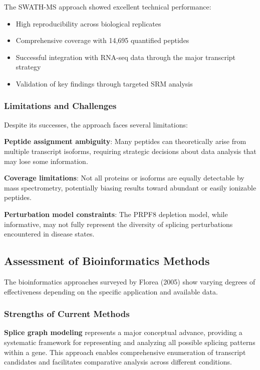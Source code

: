 \documentclass[12pt,a4paper]{article}
\begin{document}
The SWATH-MS approach showed excellent technical performance:
\begin{itemize}
    \item High reproducibility across biological replicates
    \item Comprehensive coverage with 14,695 quantified peptides
    \item Successful integration with RNA-seq data through the major transcript strategy
    \item Validation of key findings through targeted SRM analysis
\end{itemize}

\subsubsection{Limitations and Challenges}

Despite its successes, the approach faces several limitations:

\textbf{Peptide assignment ambiguity}: Many peptides can theoretically arise from multiple transcript isoforms, requiring strategic decisions about data analysis that may lose some information.

\textbf{Coverage limitations}: Not all proteins or isoforms are equally detectable by mass spectrometry, potentially biasing results toward abundant or easily ionizable peptides.

\textbf{Perturbation model constraints}: The PRPF8 depletion model, while informative, may not fully represent the diversity of splicing perturbations encountered in disease states.

\subsection{Assessment of Bioinformatics Methods}

The bioinformatics approaches surveyed by Florea (2005) show varying degrees of effectiveness depending on the specific application and available data.

\subsubsection{Strengths of Current Methods}

\textbf{Splice graph modeling} represents a major conceptual advance, providing a systematic framework for representing and analyzing all possible splicing patterns within a gene. This approach enables comprehensive enumeration of transcript candidates and facilitates comparative analysis across different conditions.
\end{document}
